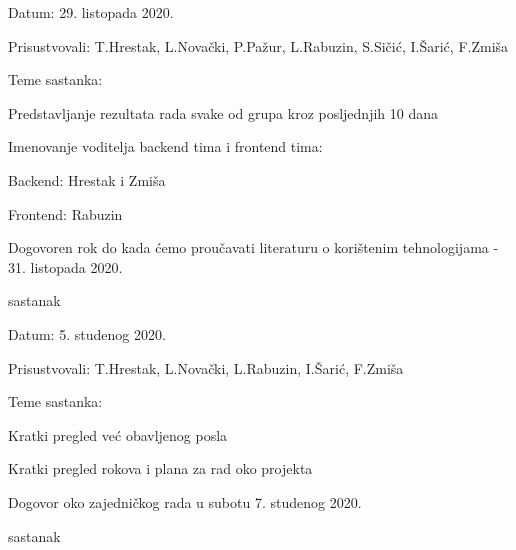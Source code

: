 \begin{packed_enum}
			\item[] \begin{packed_item}
				\item Datum: 29. listopada 2020.
				\item Prisustvovali: T.Hrestak, L.Novački, P.Pažur, L.Rabuzin, S.Sičić, I.Šarić, F.Zmiša
				\item Teme sastanka:
				\begin{packed_item}
					\item Predstavljanje rezultata rada svake od grupa kroz posljednjih 10 dana
					\item Imenovanje voditelja backend tima i frontend tima:
						\begin{packed_item}
						\item  Backend: Hrestak i Zmiša
						\item  Frontend: Rabuzin
					\end{packed_item}
					\item Dogovoren rok do kada ćemo proučavati literaturu o korištenim tehnologijama - 31. listopada 2020.
				\end{packed_item}
			
			\end{packed_item}
		
		\item sastanak
		
		\item[] \begin{packed_item}
			\item Datum: 5. studenog 2020.
			\item Prisustvovali: T.Hrestak, L.Novački, L.Rabuzin, I.Šarić, F.Zmiša
			\item Teme sastanka:
			\begin{packed_item}
				\item Kratki pregled već obavljenog posla
				\item Kratki pregled rokova i plana za rad oko projekta
				\item Dogovor oko zajedničkog rada u subotu 7. studenog 2020.
			\end{packed_item}
			
		\end{packed_item}
	
	\item sastanak
	

\end{packed_enum}
